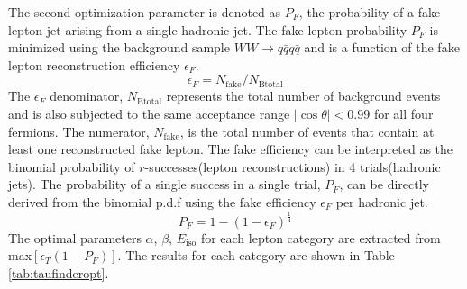  The second optimization parameter is denoted as $P_F$, the probability of a fake lepton jet arising from a single hadronic jet. The fake lepton probability $P_F$ is minimized using the background sample $WW\rightarrow q\bar{q}q\bar{q}$ and is a function of the fake lepton reconstruction efficiency $\epsilon_F$.
\begin{equation}
\label{eq:ef}
\epsilon_F = N_{\text{fake}}/N_{\text{Btotal}}
\end{equation}
The $\epsilon_F$ denominator, $N_{\text{Btotal}}$ represents the total number of background events and is also subjected to the same acceptance range $|\cos\theta| < 0.99$ for all four fermions. The numerator, $N_{\text{fake}}$, is the total number of events  that contain at least one reconstructed fake lepton. The fake efficiency can be interpreted as the binomial probability of $r$-successes(lepton reconstructions) in 4 trials(hadronic jets). The probability of a single success in a single trial, $P_F$, can be directly derived from the binomial p.d.f using the fake efficiency $\epsilon_F$ per hadronic jet. 
\begin{equation}
\label{eq:pf}
P_F = 1-(1-\epsilon_F)^{\frac{1}{4}} 
\end{equation}
The optimal parameters $\alpha$, $\beta$, $E_{\text{iso}}$ for each lepton category are extracted from max$[\epsilon_T(1-P_F)]$. The results for each category are shown in Table \ref{tab:taufinderopt}. 

